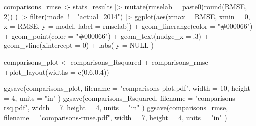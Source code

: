 \documentclass[
]{report}
\newenvironment{Shaded}{\begin{snugshade}}{\end{snugshade}}
\newcommand{\AttributeTok}[1]{\textcolor[rgb]{0.40,0.45,0.13}{#1}}
\newcommand{\ConstantTok}[1]{\textcolor[rgb]{0.56,0.35,0.01}{#1}}
\newcommand{\DecValTok}[1]{\textcolor[rgb]{0.68,0.00,0.00}{#1}}
\newcommand{\FloatTok}[1]{\textcolor[rgb]{0.68,0.00,0.00}{#1}}
\newcommand{\FunctionTok}[1]{\textcolor[rgb]{0.28,0.35,0.67}{#1}}
\newcommand{\NormalTok}[1]{\textcolor[rgb]{0.00,0.23,0.31}{#1}}
\newcommand{\OtherTok}[1]{\textcolor[rgb]{0.00,0.23,0.31}{#1}}
\newcommand{\SpecialCharTok}[1]{\textcolor[rgb]{0.37,0.37,0.37}{#1}}
\newcommand{\StringTok}[1]{\textcolor[rgb]{0.13,0.47,0.30}{#1}}
\begin{document}
\begin{Shaded}
\begin{Highlighting}[]
\NormalTok{comparisons\_rmse }\OtherTok{\textless{}{-}}\NormalTok{ stats\_results }\SpecialCharTok{|\textgreater{}} 
  \FunctionTok{mutate}\NormalTok{(}\AttributeTok{rmselab  =} \FunctionTok{paste0}\NormalTok{(}\FunctionTok{round}\NormalTok{(RMSE, }\DecValTok{2}\NormalTok{)) ) }\SpecialCharTok{|\textgreater{}} 
  \FunctionTok{filter}\NormalTok{(model }\SpecialCharTok{!=} \StringTok{"actual\_2014"}\NormalTok{) }\SpecialCharTok{|\textgreater{}} 
  \FunctionTok{ggplot}\NormalTok{(}\FunctionTok{aes}\NormalTok{(}\AttributeTok{xmax =}\NormalTok{ RMSE, }\AttributeTok{xmin =} \DecValTok{0}\NormalTok{,}
             \AttributeTok{x =}\NormalTok{ RMSE, }\AttributeTok{y =}\NormalTok{ model, }\AttributeTok{label =}\NormalTok{ rmselab)) }\SpecialCharTok{+}
  \FunctionTok{geom\_linerange}\NormalTok{(}\AttributeTok{color =} \StringTok{"\#000066"}\NormalTok{) }\SpecialCharTok{+}
  \FunctionTok{geom\_point}\NormalTok{(}\AttributeTok{color =} \StringTok{"\#000066"}\NormalTok{) }\SpecialCharTok{+}
  \FunctionTok{geom\_text}\NormalTok{(}\AttributeTok{nudge\_x =}\NormalTok{ .}\DecValTok{3}\NormalTok{) }\SpecialCharTok{+}
  \FunctionTok{geom\_vline}\NormalTok{(}\AttributeTok{xintercept =} \DecValTok{0}\NormalTok{) }\SpecialCharTok{+}
  \FunctionTok{labs}\NormalTok{(}
    \AttributeTok{y =} \ConstantTok{NULL}
\NormalTok{  ) }

\NormalTok{comparisons\_plot }\OtherTok{\textless{}{-}}\NormalTok{ comparisons\_Rsquared }\SpecialCharTok{+}\NormalTok{ comparisons\_rmse }\SpecialCharTok{+}\FunctionTok{plot\_layout}\NormalTok{(}\AttributeTok{widths =} \FunctionTok{c}\NormalTok{(}\FloatTok{0.6}\NormalTok{,}\FloatTok{0.4}\NormalTok{))}

\FunctionTok{ggsave}\NormalTok{(comparisons\_plot, }\AttributeTok{filename =} \StringTok{"comparisons{-}plot.pdf"}\NormalTok{, }\AttributeTok{width =} \DecValTok{10}\NormalTok{, }\AttributeTok{height =} \DecValTok{4}\NormalTok{, }\AttributeTok{units =} \StringTok{"in"}\NormalTok{ )}
\FunctionTok{ggsave}\NormalTok{(comparisons\_Rsquared, }\AttributeTok{filename =} \StringTok{"comparisons{-}rsq.pdf"}\NormalTok{, }\AttributeTok{width =} \DecValTok{7}\NormalTok{, }\AttributeTok{height =} \DecValTok{4}\NormalTok{, }\AttributeTok{units =} \StringTok{"in"}\NormalTok{ )}
\FunctionTok{ggsave}\NormalTok{(comparisons\_rmse, }\AttributeTok{filename =} \StringTok{"comparisons{-}rmse.pdf"}\NormalTok{, }\AttributeTok{width =} \DecValTok{7}\NormalTok{, }\AttributeTok{height =} \DecValTok{4}\NormalTok{, }\AttributeTok{units =} \StringTok{"in"}\NormalTok{ )}
\end{Highlighting}
\end{Shaded}
\end{document}
